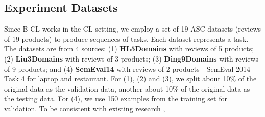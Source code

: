 \documentclass[11pt]{article}
\begin{document}
\subsection{Experiment Datasets}


\begin{table}[]
\centering
{}
\caption{Number of examples in each task or dataset. More detailed data statistics are given in the \textit{Appendix}.}
\label{tab:dataset_main}
\vspace{-3mm}
\end{table}
{\color{black}Since B-CL works in the CL setting, we employ a set of 19 ASC datasets (reviews of 19 products) to produce sequences of tasks. Each dataset represents a task. The datasets are from 4 sources:} (1) \textbf{HL5Domains} \cite{hu2004mining} with reviews of 5 products; (2) \textbf{Liu3Domains} \cite{liu2015automated} with reviews of 3 products; (3) \textbf{Ding9Domains} \cite{ding2008holistic} with reviews of 9 products; and (4) \textbf{SemEval14} with reviews of 2 products - SemEval 2014 Task 4 for laptop and restaurant. For (1), (2) and (3), we split about 10\% of the original data as the validation data, another about 10\% of the original data as the testing data. For (4), we use 150 examples from the training set for validation. To be consistent with existing research \cite{tang-etal-2016-aspect},
\end{document}
